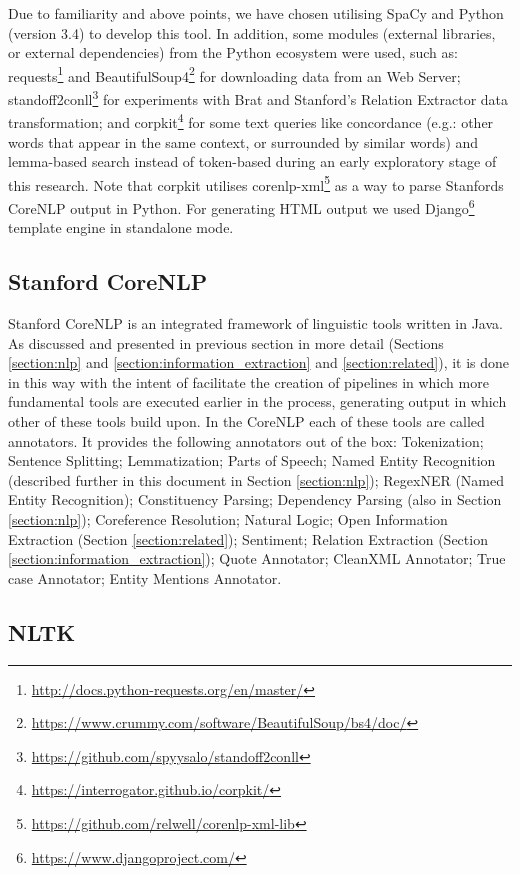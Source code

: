 \documentclass[11pt,a4paper,openright]{memoir}
\begin{document}
Due to familiarity and above points, we have chosen utilising SpaCy and Python (version 3.4) to develop this tool. In addition, some modules (external libraries, or external dependencies) from the Python ecosystem were used, such as: requests\footnote{\url{http://docs.python-requests.org/en/master/}} and BeautifulSoup4\footnote{\url{https://www.crummy.com/software/BeautifulSoup/bs4/doc/}} for downloading data from an Web Server; standoff2conll\footnote{\url{https://github.com/spyysalo/standoff2conll}} for experiments with Brat and Stanford's Relation Extractor data transformation; and corpkit\footnote{\url{https://interrogator.github.io/corpkit/}} for some text queries like concordance (e.g.: other words that appear in the same context, or surrounded by similar words) and lemma-based search instead of token-based during an early exploratory stage of this research. Note that corpkit utilises corenlp-xml\footnote{\url{https://github.com/relwell/corenlp-xml-lib}} as a way to parse Stanfords CoreNLP output in Python. For generating HTML output we used Django\footnote{\url{https://www.djangoproject.com/}} template engine in standalone mode.

\subsection{Stanford CoreNLP}

Stanford CoreNLP \cite{manning-EtAl:2014:P14-5} is an integrated framework of linguistic tools written in Java. As discussed and presented in previous section in more detail (Sections \ref{section:nlp} and \ref{section:information_extraction} and \ref{section:related}), it is done in this way with the intent of facilitate the creation of pipelines in which more fundamental tools are executed earlier in the process, generating output in which other of these tools build upon. In the CoreNLP each of these tools are called annotators. It provides the following annotators out of the box: Tokenization; Sentence Splitting; Lemmatization; Parts of Speech; Named Entity Recognition (described further in this document in Section \ref{section:nlp}); RegexNER (Named Entity Recognition); Constituency Parsing; Dependency Parsing (also in Section \ref{section:nlp}); Coreference Resolution; Natural Logic; Open Information Extraction (Section \ref{section:related}); Sentiment; Relation Extraction (Section \ref{section:information_extraction}); Quote Annotator; CleanXML Annotator; True case Annotator; Entity Mentions Annotator.

\subsection{NLTK}
\end{document}
